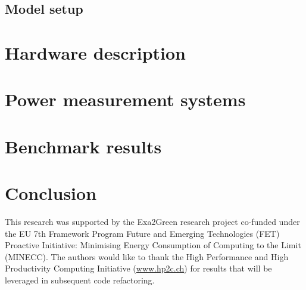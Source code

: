 \documentclass[twocolumn]{svjour3}           %
\DeclareRobustCommand\IPCClongname{}
\begin{document}
\subsection{Model setup}
\label{subsec:1.2}


\section{Hardware description}
\label{sec:2}

\section{Power measurement systems}
\label{sec:3}

\section{Benchmark results}
\label{sec:4}

\section{Conclusion}
\label{concl}




\begin{acknowledgements}
This  research  was  supported   by  the  Exa2Green  research  project
co-funded  under the  EU  7th Framework  Program  Future and  Emerging
Technologies (FET) Proactive Initiative: Minimising Energy Consumption
of Computing to  the Limit (MINECC).  The authors  would like to thank
the  High  Performance  and  High  Productivity  Computing  Initiative
(\url{www.hp2c.ch}) for  results that will be  leveraged in subsequent
code refactoring.
\end{acknowledgements}

\DeclareRobustCommand\IPCClongname{ - Intergovernmental Panel on Climate Change}



\end{document}
